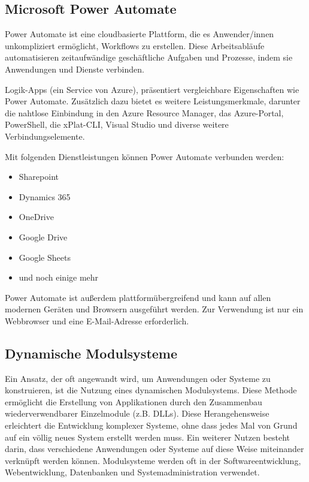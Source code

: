 \subsection*{Microsoft Power Automate}

Power Automate ist eine cloudbasierte Plattform, die es Anwender/innen unkompliziert ermöglicht, 
Workflows zu erstellen. Diese Arbeitsabläufe automatisieren zeitaufwändige 
geschäftliche Aufgaben und Prozesse, indem sie Anwendungen und Dienste verbinden. \cite{power_automate}

Logik-Apps (ein Service von Azure), 
präsentiert vergleichbare Eigenschaften wie Power Automate. Zusätzlich dazu 
bietet es weitere Leistungsmerkmale, darunter die nahtlose Einbindung in den 
Azure Resource Manager, das Azure-Portal, PowerShell, die xPlat-CLI, Visual Studio und 
diverse weitere Verbindungselemente. \cite{power_automate}

Mit folgenden Dienstleistungen können Power Automate verbunden werden:

\begin{itemize}
    \item Sharepoint
    \item Dynamics 365
    \item OneDrive
    \item Google Drive
    \item Google Sheets
    \item und noch einige mehr
\end{itemize}

Power Automate ist außerdem plattformübergreifend und kann auf allen modernen Geräten und Browsern
ausgeführt werden. Zur Verwendung ist nur ein Webbrowser und eine E-Mail-Adresse erforderlich.
\cite{power_automate}

\newpage
\subsection*{Dynamische Modulsysteme}

Ein Ansatz, der oft angewandt wird, um Anwendungen oder Systeme zu konstruieren, 
ist die Nutzung eines dynamischen Modulsystems. Diese Methode ermöglicht die Erstellung 
von Applikationen durch den Zusammenbau wiederverwendbarer Einzelmodule (z.B. DLLs). 
Diese Herangehensweise erleichtert die Entwicklung komplexer Systeme, ohne dass jedes 
Mal von Grund auf ein völlig neues System erstellt werden muss. Ein weiterer Nutzen besteht darin, 
dass verschiedene Anwendungen oder Systeme auf diese Weise miteinander verknüpft werden können.
Modulsysteme werden oft in der Softwareentwicklung, Webentwicklung, 
Datenbanken und Systemadministration verwendet. \cite{modulsystem}

